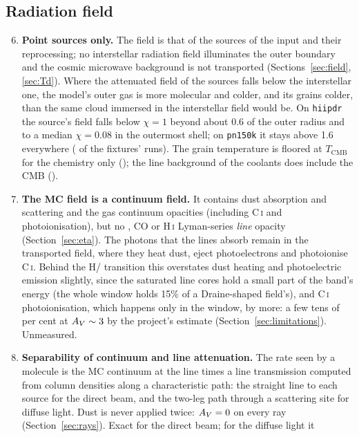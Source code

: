\subsection{Radiation field}
\begin{enumerate}\setcounter{enumi}{5}
\item \textbf{Point sources only.} The field is that of the sources of the
  input and their reprocessing; no interstellar radiation field illuminates the
  outer boundary and the cosmic microwave background is not transported
  (Sections~\ref{sec:field}, \ref{sec:Td}). Where the attenuated field of the
  sources falls below the interstellar one, the model's outer gas is more
  molecular and colder, and its grains colder, than the same cloud immersed in
  the interstellar field would be. On \texttt{hiipdr} the source's field falls
  below $\chi=1$ beyond about 0.6 of the outer radius and to a median
  $\chi=0.08$ in the outermost shell; on \texttt{pn150k} it stays above 1.6
  everywhere ( of the fixtures' runs). The grain
  temperature is floored at $T_{\mathrm{CMB}}$ for the chemistry only
  (); the line background of the coolants does include the CMB
  ().
\item \textbf{The MC field is a continuum field.} It contains dust absorption
  and scattering and the gas continuum opacities (including C\,\textsc{i} and
  \Htwo{} photoionisation), but no \Htwo, CO or H\,\textsc{i} Lyman-series
  \emph{line} opacity (Section~\ref{sec:eta}). The photons that the \Htwo{} lines
  absorb remain in the transported field, where they heat dust, eject
  photoelectrons and photoionise C\,\textsc{i}. Behind the H/\Htwo{} transition
  this overstates dust heating and photoelectric emission slightly, since the
  saturated line cores hold a small part of the band's energy (the whole window
  holds 15\% of a Draine-shaped field's), and C\,\textsc{i} photoionisation, which
  happens only in the window, by more: a few tens of per cent at $A_{V}\sim3$ by
  the project's estimate (Section~\ref{sec:limitations}). Unmeasured.
\item \textbf{Separability of continuum and line attenuation.} The rate seen by
  a molecule is the MC continuum at the line times a line transmission computed
  from column densities along a characteristic path: the straight line to each
  source for the direct beam, and the two-leg path through a scattering site
  for diffuse light. Dust is never applied twice: $A_{V}=0$ on every ray
  (Section~\ref{sec:rays}). Exact for the direct beam; for the diffuse light it

\end{enumerate}
